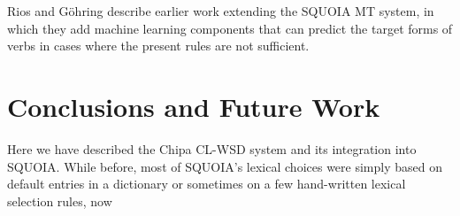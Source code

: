 \documentclass[10pt, a4paper]{article}
\begin{document}
Rios and G\"{o}hring  describe
earlier work extending the SQUOIA MT system, in which they add machine learning
components that can predict the target forms of verbs in cases where the
present rules are not sufficient.

\section{Conclusions and Future Work}
Here we have described the Chipa CL-WSD system and its integration into SQUOIA.
While before, most of SQUOIA's lexical choices were simply based on default
entries in a dictionary or sometimes on a few hand-written lexical selection
rules, now 




\end{document}
